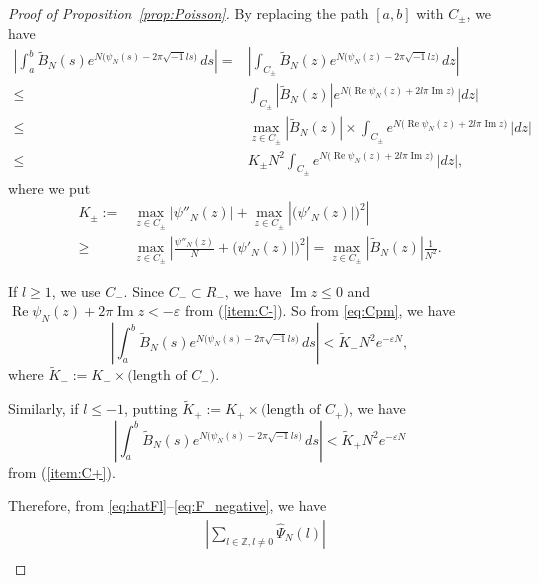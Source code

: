 \documentclass[a4paper,dvipdfmx]{amsart}
\theoremstyle{plain}
\theoremstyle{definition}
\theoremstyle{remark}
\newcommand{\Z}{\mathbb{Z}}
\renewcommand{\Re}{\operatorname{Re}}
\renewcommand{\Im}{\operatorname{Im}}
\renewcommand{\i}{\sqrt{-1}}
\numberwithin{equation}{section}
\begin{document}
\begin{proof}[Proof of Proposition~\ref{prop:Poisson}]
\par
By replacing the path $[a,b]$ with $C_{\pm}$, we have
\begin{equation}\label{eq:Cpm}
\begin{split}
  \left|\int_{a}^{b}\tilde{B}_N(s)e^{N\bigl(\psi_N(s)-2\pi\i ls\bigr)}\,ds\right|
  =&
  \left|\int_{C_{\pm}}\tilde{B}_N(z)e^{N\bigl(\psi_N(z)-2\pi\i lz\bigr)}\,dz\right|
  \\
  \le&
  \int_{C_{\pm}}\left|\tilde{B}_N(z)\right|e^{N\bigl(\Re{\psi_N(z)}+2l\pi\Im{z}\bigr)}\,|dz|
  \\
  \le&
  \max_{z\in C_{\pm}}\left|\tilde{B}_N(z)\right|
  \times
  \int_{C_{\pm}}e^{N\bigl(\Re{\psi_N(z)}+2l\pi\Im{z}\bigr)}\,|dz|
  \\
  \le&
  K_{\pm}N^2
  \int_{C_{\pm}}e^{N\bigl(\Re{\psi_N(z)}+2l\pi\Im{z}\bigr)}\,|dz|,
\end{split}
\end{equation}
where we put
\begin{align*}
  K_{\pm}
  :=&
  \max_{z\in C_{\pm}}|\psi''_N(z)|
  +
  \max_{z\in C_{\pm}}\left|\bigl(\psi'_N(z)|\bigr)^2\right|
  \\
  \ge&
  \max_{z\in C_{\pm}}
  \left|
    \frac{\psi''_N(z)}{N}+\bigl(\psi'_N(z)|\bigr)^2
  \right|
  =
  \max_{z\in C_{\pm}}\left|\tilde{B}_N(z)\right|\frac{1}{N^2}.
\end{align*}
\par
If $l\ge1$, we use $C_{-}$.
Since $C_{-}\subset R_{-}$, we have $\Im{z}\le0$ and $\Re{\psi_N(z)}+2\pi\Im{z}<-\varepsilon$  from (\ref{item:C-}).
So from \eqref{eq:Cpm}, we have
\begin{equation}\label{eq:F_positive}
  \left|\int_{a}^{b}\tilde{B}_N(s)e^{N\bigl(\psi_N(s)-2\pi\i ls\bigr)}\,ds\right|
  <
  \tilde{K}_{-}N^2e^{-\varepsilon N},
\end{equation}
where $\tilde{K}_{-}:=K_{-}\times\text{(length of $C_{-}$)}$.
\par
Similarly, if $l\le-1$, putting $\tilde{K}_{+}:=K_{+}\times\text{(length of $C_{+}$)}$, we have
\begin{equation}\label{eq:F_negative}
  \left|\int_{a}^{b}\tilde{B}_N(s)e^{N\bigl(\psi_N(s)-2\pi\i ls\bigr)}\,ds\right|
  <
  \tilde{K}_{+}N^2e^{-\varepsilon N}
\end{equation}
from (\ref{item:C+}).
\par
Therefore, from \eqref{eq:hatFl}--\eqref{eq:F_negative}, we have
\begin{align*}
  &\left|\sum_{l\in\Z,l\ne0}\hat\Psi_N(l)\right|
  \\

\end{align*}
\end{proof}
\end{document}
